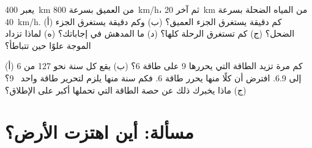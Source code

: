\begin{exercise}[$\star\star\star$]\label{exo:g7:earthquakes:11}
يعبر  \qty{400}{km} من  العميق بسرعة \qty{800}{km/h}، ثم
آخر \qty{20}{km} من المياه الضحلة بسرعة \qty{40}{km/h}. (أ) كم دقيقة
يستغرق الجزء العميق؟ (ب) وكم دقيقة يستغرق الجزء الضحل؟ (ج) كم تستغرق الرحلة
كلها؟ (د) ما المدهش في إجاباتك؟ (ه) لماذا تزداد الموجة علوًا حين تتباطأ؟
\end{exercise}

\begin{exercise}[$\star\star\star$]\label{exo:g7:earthquakes:12}
(أ) كم مرة تزيد الطاقة التي يحررها   9 على طاقة   6؟
(ب) يقع كل سنة نحو 127   من 6 إلى 6.9. افترض أن كلًا منها
يحرر طاقة   6. فكم سنة منها يلزم لتحرير طاقة  واحد
~9؟ (ج) ماذا يخبرك ذلك عن حصة الطاقة التي تحملها أكبر  على
الإطلاق؟
\end{exercise}

\section{مسألة: أين اهتزت الأرض؟}

